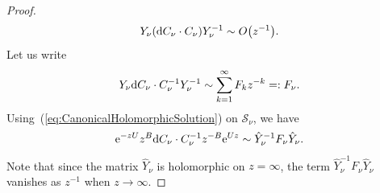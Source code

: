 \documentclass[pdftex]{sigma}
\numberwithin{equation}{section}
\begin{document}
\begin{proof}
\begin{equation*}
 Y_{\nu}({\rm d}C_{\nu}\cdot C_{\nu})Y_{\nu}^{-1}\sim O\bigl(z^{-1}\bigr).
\end{equation*}
 Let us write
 \begin{equation*}
 Y_{\nu}{\rm d}C_{\nu}\cdot C_{\nu}^{-1}Y_{\nu}^{-1}\sim\sum_{k=1}^{\infty}F_{k}z^{-k}=:F_{\nu}.
 \end{equation*}
 Using~(\ref{eq:CanonicalHolomorphicSolution}) on $\mathcal{S}_{\nu}$, we have
 \begin{equation*}
 {\rm e}^{-zU}z^{B}{\rm d} C_{\nu}\cdot C_{\nu}^{-1}z^{-B}{\rm e}^{Uz}\sim \hat{Y}_{\nu}^{-1}F_{\nu}\hat{Y}_{\nu}.
 \end{equation*}
 Note that since the matrix $\hat{Y}_{\nu}$ is holomorphic on $z=\infty$, the term $\hat{Y}_{\nu}^{-1}F_{\nu}\hat{Y}_{\nu}$ vanishes as $z^{-1}$ when $z\rightarrow\infty$.


\end{proof}
\end{document}
